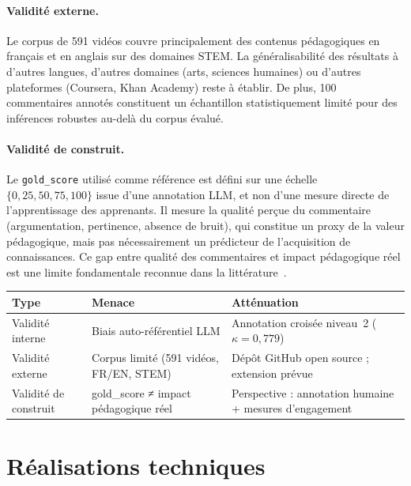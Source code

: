 \documentclass[12pt, a4paper]{article}
\begin{document}
\paragraph{Validité externe.}
Le corpus de 591 vidéos couvre principalement des contenus pédagogiques en
français et en anglais sur des domaines STEM. La généralisabilité des résultats
à d'autres langues, d'autres domaines (arts, sciences humaines) ou d'autres
plateformes (Coursera, Khan Academy) reste à établir. De plus, 100 commentaires
annotés constituent un échantillon statistiquement limité pour des inférences
robustes au-delà du corpus évalué.

\paragraph{Validité de construit.}
Le \texttt{gold\_score} utilisé comme référence est défini sur une échelle
$\{0, 25, 50, 75, 100\}$ issue d'une annotation LLM, et non d'une mesure directe
de l'apprentissage des apprenants. Il mesure la qualité perçue du commentaire
(argumentation, pertinence, absence de bruit), qui constitue un proxy de la
valeur pédagogique, mais pas nécessairement un prédicteur de l'acquisition
de connaissances. Ce gap entre qualité des commentaires et impact pédagogique
réel est une limite fondamentale reconnue dans la littérature~\cite{park2016comment}.

\begin{center}
\small
\begin{tabular}{p{2.8cm}p{4cm}p{4.5cm}}
\toprule
\textbf{Type} & \textbf{Menace} & \textbf{Atténuation} \\
\midrule
Validité interne    & Biais auto-référentiel LLM & Annotation croisée niveau~2 ($\kappa = 0{,}779$) \\
Validité externe    & Corpus limité (591 vidéos, FR/EN, STEM) & Dépôt GitHub open source ; extension prévue \\
Validité de construit & gold\_score ≠ impact pédagogique réel & Perspective : annotation humaine + mesures d'engagement \\
\bottomrule
\end{tabular}
\end{center}

\section{Réalisations techniques}
\end{document}
